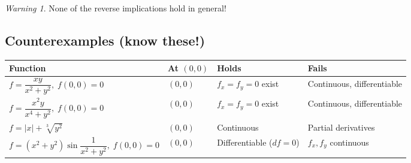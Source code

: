 \documentclass[12pt,a4paper]{article}
\theoremstyle{definition}
\theoremstyle{remark}
\newtheorem{warning}[theorem]{Warning}
\begin{document}
\begin{center}
\end{center}

\begin{warning}
None of the reverse implications hold in general!
\end{warning}

\subsection*{Counterexamples (know these!)}

\begin{center}
\renewcommand{\arraystretch}{1.4}
\begin{tabular}{llll}
\toprule
Function & At $(0,0)$ & Holds & Fails \\
\midrule
$f=\dfrac{xy}{x^2+y^2},\;f(0,0)=0$ & $(0,0)$ & $f_x=f_y=0$ exist & Continuous, differentiable \\[8pt]
$f=\dfrac{x^2 y}{x^4+y^2},\;f(0,0)=0$ & $(0,0)$ & $f_x=f_y=0$ exist & Continuous, differentiable \\[8pt]
$f=|x|+\sqrt[3]{y^2}$ & $(0,0)$ & Continuous & Partial derivatives \\[8pt]
$f=(x^2+y^2)\sin\!\dfrac{1}{x^2+y^2},\;f(0,0)=0$ & $(0,0)$ & Differentiable ($df=0$) & $f_x,f_y$ continuous \\
\bottomrule
\end{tabular}
\end{center}
\end{document}
